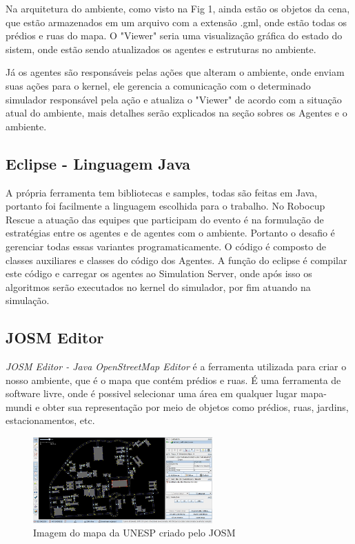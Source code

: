 \documentclass[conference]{IEEEtran}
\begin{document}
Na arquitetura do ambiente, como visto na Fig 1, ainda estão os objetos da cena, que estão armazenados em um arquivo com a extensão .gml, onde estão todas os prédios e ruas do mapa. O "Viewer" seria uma visualização gráfica do estado do sistem, onde estão sendo atualizados os agentes e estruturas no ambiente. 

Já os agentes são responsáveis pelas ações que alteram o ambiente, onde enviam suas ações para o kernel, ele gerencia a comunicação com o determinado simulador responsável pela ação e atualiza o "Viewer" de acordo com a situação atual do ambiente, mais detalhes serão explicados na seção sobres os Agentes e o ambiente.
\subsection{Eclipse - Linguagem Java}
A própria ferramenta tem bibliotecas e samples, todas são feitas em Java, portanto foi facilmente a linguagem escolhida para o trabalho. No Robocup Rescue a atuação das equipes que participam do evento é na formulação de estratégias entre os agentes e de agentes com o ambiente. Portanto o desafio é gerenciar todas essas variantes programaticamente. 
O código é composto de classes auxiliares e classes do código dos Agentes. A função do eclipse é compilar este código e carregar os agentes ao Simulation Server, onde após isso os algoritmos serão executados no kernel do simulador, por fim atuando na simulação.

\subsection{JOSM Editor}
\textit {JOSM Editor - Java OpenStreetMap Editor} é a ferramenta utilizada para criar o nosso ambiente, que é o mapa que contém prédios e ruas. É uma ferramenta de software livre, onde é possivel selecionar uma área em qualquer lugar mapa-mundi e obter sua representação por meio de objetos como prédios, ruas, jardins, estacionamentos, etc.

\begin{figure}[htbp]
\centerline{\includegraphics[height=3.3cm]{fig3.jpeg}}
\caption{Imagem do mapa da UNESP criado pelo JOSM \cite{b2}}
\label{fig2}
\end{figure}
\end{document}
